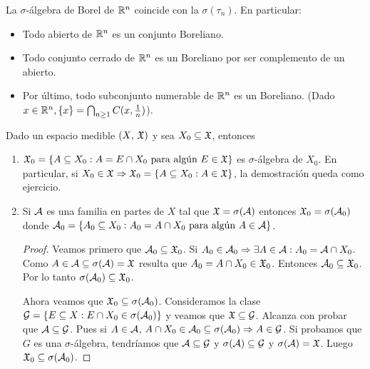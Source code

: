 \begin{corollary}
    La $\sigma$-álgebra de Borel de $\mathbb{R}^n$ coincide con la $\sigma(\tau_n)$. En particular:
    \begin{itemize}
        \item Todo abierto de $\mathbb{R}^n$ es un conjunto Boreliano.
        \item Todo conjunto cerrado de $\mathbb{R}^n$ es un Boreliano por ser complemento de un abierto.
        \item Por último, todo subconjunto numerable de $\mathbb{R}^n$ es un Boreliano. (Dado $x \in \mathbb{R}^n, \{ x \} = \bigcap_{n \geq 1}C(x, \frac{1}{n})$).
    \end{itemize}
\end{corollary}

\clearpage

\begin{prop}
    Dado un espacio medible $(X\text{, } \mathfrak{X})$ y sea $X_0 \subseteq \mathfrak{X}$, entonces
    \begin{enumerate}
        \item $\mathfrak{X}_0 = \{ A \subseteq X_0 : A = E \cap X_0 \text{ para algún } E \in \mathfrak{X} \}$ es $\sigma$-álgebra de $X_0$. En particular,
              si $X_0 \in \mathfrak{X} \Rightarrow \mathfrak{X}_0 = \{ A \subseteq X_0 : A \in \mathfrak{X} \}$, la demostración queda como ejercicio.
        \item Si $\mathcal{A}$ es una familia en partes de $X$ tal que $\mathfrak{X} = \sigma(\mathcal{A})$ entonces $\mathfrak{X}_0 = \sigma(\mathcal{A}_0)$ donde
              $\mathcal{A}_0 = \{ A_0 \subseteq X_0 : A_0 = A \cap X_0 \text{ para algún } A \in \mathcal{A} \}$.
              \begin{proof}
                  Veamos primero que $\mathcal{A}_0 \subseteq \mathfrak{X}_0$. Si $A_0 \in \mathcal{A}_0 \Rightarrow \exists A \in \mathcal{A} : A_0 = \mathcal{A} \cap X_0$.
                  Como $A \in \mathcal{A} \subseteq \sigma(\mathcal{A}) = \mathfrak{X}$ resulta que $A_0 = A \cap X_0 \in \mathfrak{X}_0$.
                  Entonces $\mathcal{A}_0 \subseteq \mathfrak{X}_0$. Por lo tanto $\sigma(\mathcal{A}_0) \subseteq \mathfrak{X}_0$.

                  Ahora veamos que $\mathfrak{X}_0 \subseteq \sigma(\mathcal{A}_0)$.
                  Consideramos la clase $\mathcal{G} = \{ E \subseteq X : E \cap X_0 \in \sigma(\mathcal{A}_0) \}$ y veamos que $\mathfrak{X} \subseteq \mathcal{G}$.
                  Alcanza con probar que $\mathcal{A} \subseteq \mathcal{G}$. Pues si $A \in \mathcal{A}$, $A \cap X_0 \in \mathcal{A}_0 \subseteq \sigma(\mathcal{A}_0) \Rightarrow A \in \mathcal{G}$.
                  Si probamos que $G$ es una $\sigma$-álgebra, tendríamos que $\mathcal{A} \subseteq \mathcal{G}$ y $\sigma(\mathcal{A}) \subseteq \mathcal{G}$ y $\sigma(\mathcal{A}) = \mathfrak{X}$.
                  Luego $\mathfrak{X}_0 \subseteq \sigma(\mathcal{A}_0)$.
              \end{proof}
    \end{enumerate}
\end{prop}

